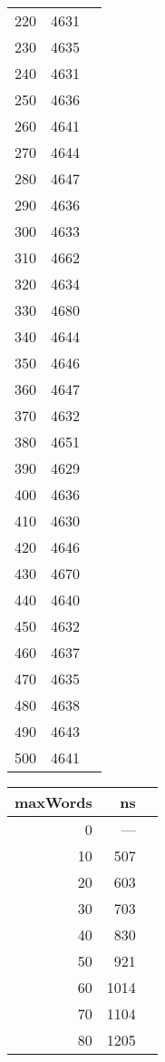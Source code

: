 \begin{figure}[H]
\begin{tabular}{r r r}
        220 & 4631 \\
        230 & 4635 \\
        240 & 4631 \\
        250 & 4636 \\
        260 & 4641 \\
        270 & 4644 \\
        280 & 4647 \\
        290 & 4636 \\
        300 & 4633 \\
        310 & 4662 \\
        320 & 4634 \\
        330 & 4680 \\
        340 & 4644 \\
        350 & 4646 \\
        360 & 4647 \\
        370 & 4632 \\
        380 & 4651 \\
        390 & 4629 \\
        400 & 4636 \\
        410 & 4630 \\
        420 & 4646 \\
        430 & 4670 \\
        440 & 4640 \\
        450 & 4632 \\
        460 & 4637 \\
        470 & 4635 \\
        480 & 4638 \\
        490 & 4643 \\
        500 & 4641 \\
        \bottomrule
    \end{tabular}
    \quad
    \begin{tabular}{r r r}
        \toprule
        \textbf{maxWords} & \textbf{ns} \\
        \midrule
        0 & --- \\
        10 & 507 \\
        20 & 603 \\
        30 & 703 \\
        40 & 830 \\
        50 & 921 \\
        60 & 1014 \\
        70 & 1104 \\
        80 & 1205 \\

\end{tabular}
\end{figure}

